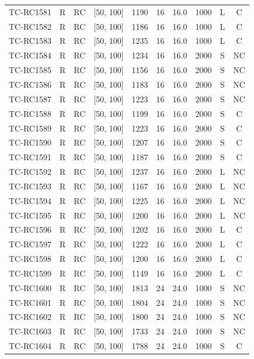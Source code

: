 \begin{longtable}{lccccccccc}
TC-RC1581 & R & RC & [50, 100] & 1190 & 16 & 16.0 & 1000 & L & C \\
TC-RC1582 & R & RC & [50, 100] & 1186 & 16 & 16.0 & 1000 & L & C \\
TC-RC1583 & R & RC & [50, 100] & 1235 & 16 & 16.0 & 1000 & L & C \\
TC-RC1584 & R & RC & [50, 100] & 1234 & 16 & 16.0 & 2000 & S & NC \\
TC-RC1585 & R & RC & [50, 100] & 1156 & 16 & 16.0 & 2000 & S & NC \\
TC-RC1586 & R & RC & [50, 100] & 1183 & 16 & 16.0 & 2000 & S & NC \\
TC-RC1587 & R & RC & [50, 100] & 1223 & 16 & 16.0 & 2000 & S & NC \\
TC-RC1588 & R & RC & [50, 100] & 1199 & 16 & 16.0 & 2000 & S & C \\
TC-RC1589 & R & RC & [50, 100] & 1223 & 16 & 16.0 & 2000 & S & C \\
TC-RC1590 & R & RC & [50, 100] & 1207 & 16 & 16.0 & 2000 & S & C \\
TC-RC1591 & R & RC & [50, 100] & 1187 & 16 & 16.0 & 2000 & S & C \\
TC-RC1592 & R & RC & [50, 100] & 1237 & 16 & 16.0 & 2000 & L & NC \\
TC-RC1593 & R & RC & [50, 100] & 1167 & 16 & 16.0 & 2000 & L & NC \\
TC-RC1594 & R & RC & [50, 100] & 1225 & 16 & 16.0 & 2000 & L & NC \\
TC-RC1595 & R & RC & [50, 100] & 1200 & 16 & 16.0 & 2000 & L & NC \\
TC-RC1596 & R & RC & [50, 100] & 1202 & 16 & 16.0 & 2000 & L & C \\
TC-RC1597 & R & RC & [50, 100] & 1222 & 16 & 16.0 & 2000 & L & C \\
TC-RC1598 & R & RC & [50, 100] & 1200 & 16 & 16.0 & 2000 & L & C \\
TC-RC1599 & R & RC & [50, 100] & 1149 & 16 & 16.0 & 2000 & L & C \\
TC-RC1600 & R & RC & [50, 100] & 1813 & 24 & 24.0 & 1000 & S & NC \\
TC-RC1601 & R & RC & [50, 100] & 1804 & 24 & 24.0 & 1000 & S & NC \\
TC-RC1602 & R & RC & [50, 100] & 1800 & 24 & 24.0 & 1000 & S & NC \\
TC-RC1603 & R & RC & [50, 100] & 1733 & 24 & 24.0 & 1000 & S & NC \\
TC-RC1604 & R & RC & [50, 100] & 1788 & 24 & 24.0 & 1000 & S & C \\

\end{longtable}
